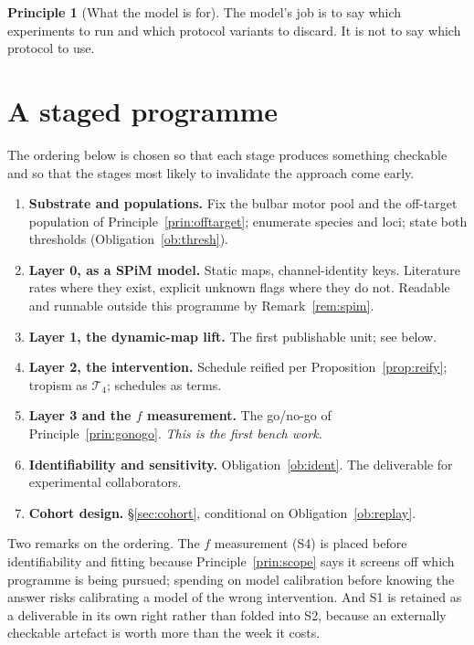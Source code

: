 \documentclass[11pt,a4paper]{article}
\theoremstyle{plain}
\theoremstyle{definition}
\newtheorem{principle}[theorem]{Principle}
\theoremstyle{remark}
\begin{document}
\begin{principle}[What the model is for]\label{prin:for}
The model's job is to say which experiments to run and which protocol variants
to discard. It is not to say which protocol to use.
\end{principle}

\section{A staged programme}\label{sec:programme}

The ordering below is chosen so that each stage produces something checkable
and so that the stages most likely to invalidate the approach come early.

\begin{enumerate}[leftmargin=1.6em,itemsep=4pt]
\item[\textbf{S0}] \textbf{Substrate and populations.} Fix the bulbar motor
pool and the off-target population of Principle~\ref{prin:offtarget};
enumerate species and loci; state both thresholds
(Obligation~\ref{ob:thresh}).
\item[\textbf{S1}] \textbf{Layer 0, as a SPiM model.} Static maps,
channel-identity keys. Literature rates where they exist, explicit
\textsf{unknown} flags where they do not. Readable and runnable outside this
programme by Remark~\ref{rem:spim}.
\item[\textbf{S2}] \textbf{Layer 1, the dynamic-map lift.} The first
publishable unit; see below.
\item[\textbf{S3}] \textbf{Layer 2, the intervention.} Schedule reified per
Proposition~\ref{prop:reify}; tropism as $\mathcal{T}_4$; schedules as terms.
\item[\textbf{S4}] \textbf{Layer 3 and the $f$ measurement.} The go/no-go of
Principle~\ref{prin:gonogo}. \emph{This is the first bench work.}
\item[\textbf{S5}] \textbf{Identifiability and sensitivity.}
Obligation~\ref{ob:ident}. The deliverable for experimental collaborators.
\item[\textbf{S6}] \textbf{Cohort design.} \S\ref{sec:cohort}, conditional on
Obligation~\ref{ob:replay}.
\end{enumerate}

Two remarks on the ordering. The $f$ measurement (S4) is placed before
identifiability and fitting because Principle~\ref{prin:scope} says it screens
off which programme is being pursued; spending on model calibration before
knowing the answer risks calibrating a model of the wrong intervention. And
S1 is retained as a deliverable in its own right rather than folded into S2,
because an externally checkable artefact is worth more than the week it costs.
\end{document}
